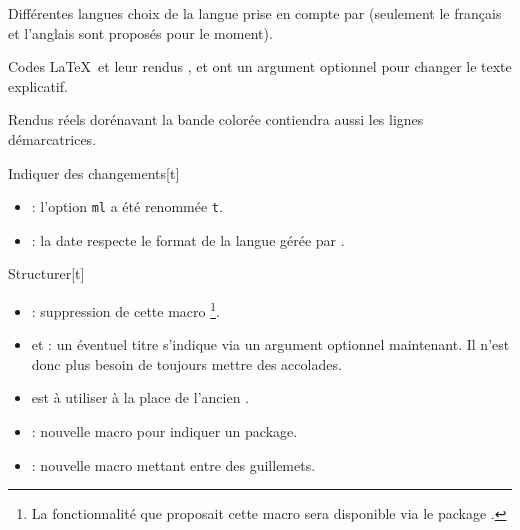 \begin{doctopic}{Différentes langues}
    choix de la langue prise en compte par 
    (seulement le français et l'anglais sont proposés pour le moment).
\end{doctopic}




\begin{doctopic}{Codes \LaTeX\ et leur rendus}
    ,
    et
    ont un argument optionnel pour changer le texte explicatif.
\end{doctopic}




\begin{doctopic}{Rendus réels}
    dorénavant la bande colorée contiendra aussi les lignes démarcatrices.
\end{doctopic}




\begin{doctopic}{Indiquer des changements}[t]
    \begin{itemize}
        \item {} : 
              l'option \texttt{ml} a été renommée \texttt{t}.

        \item {} :
              la date respecte le format de la langue gérée par .
    \end{itemize}
\end{doctopic}




\begin{doctopic}{Structurer}[t]
    \begin{itemize}
        \item {} :
              suppression de cette macro
              \footnote{
                  La fonctionnalité que proposait cette macro sera disponible via le package .
              }.

        \item {} et  :
              un éventuel titre s'indique via un argument optionnel maintenant.
              Il n'est donc plus besoin de toujours mettre des accolades.

        \item {}
              est à utiliser à la place de l'ancien
              .

        \item {} :
              nouvelle macro pour indiquer un package.

        \item {} :
              nouvelle macro mettant entre des guillemets.
    \end{itemize}
\end{doctopic}

